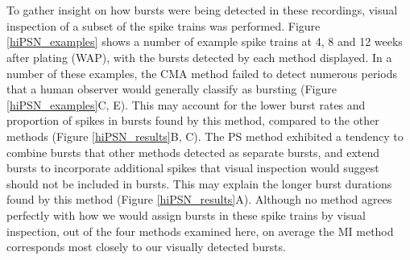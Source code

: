 \documentclass[12pt, titlepage]{article}
\begin{document}
	\\ \\ To gather insight on how bursts were being detected in these recordings, visual inspection of a subset of the spike trains was performed.  Figure \ref{hiPSN_examples} shows a number of example spike trains at 4, 8 and 12 weeks after plating (WAP), with the bursts detected by each method displayed. In a number of these examples, the CMA method failed to detect numerous periods that a human observer would generally classify as bursting (Figure \ref{hiPSN_examples}C, E). This may account for the lower burst rates and proportion of spikes in bursts found by this method, compared to the other methods (Figure \ref{hiPSN_results}B, C). The PS method exhibited a tendency to combine bursts that other methods detected as separate bursts, and extend bursts to incorporate additional spikes that visual inspection would suggest should not be included in bursts. This may explain the longer burst durations found by this method (Figure \ref{hiPSN_results}A). Although no method agrees perfectly with how we would assign bursts in these spike trains by visual inspection, out of the four methods examined here, on average the MI method corresponds most closely to our visually detected bursts. 
\end{document}

